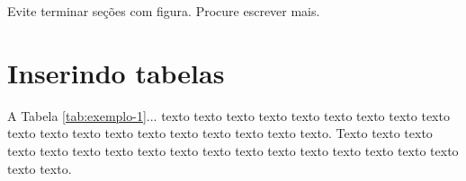     Evite terminar seções com figura. Procure escrever mais.

\section{Inserindo tabelas}\label{sec:tabelas}
    
    A Tabela \ref{tab:exemplo-1}... texto texto texto texto texto texto texto texto texto texto texto texto texto texto texto texto texto texto texto. Texto texto texto texto texto texto texto texto texto texto texto texto texto texto texto texto texto texto texto.
	
	\begin{table}[!h]
	\captionsetup{width=7cm}%
	\caption{\label{tab:exemplo-1} Um Exemplo de tabela alinhada que pode ser longa ou curta}%
    \end{table}


